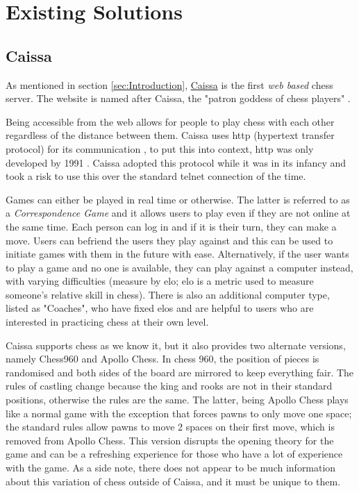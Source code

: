 \section{Existing Solutions}
\label{ExistingSolutions}

\subsection{Caissa}
\label{Caissa}

As mentioned in section \ref{sec:Introduction}, \href{https://caissa.com}{Caissa} is the first \emph{web based} chess server. The website is named after Caissa, the "patron goddess of chess players" \cite{WhoIsCaissa}. 

Being accessible from the web allows for people to play chess with each other regardless of the distance between them. Caissa uses http (hypertext transfer protocol) for its communication \cite{CaissaAboutPage}, to put this into context, http was only developed by 1991 \cite{HTTP}. Caissa adopted this protocol while it was in its infancy and took a risk to use this over the standard telnet connection of the time.

\cite{CaissaHomePage} Games can either be played in real time or otherwise. The latter is referred to as a \emph{Correspondence Game} and it allows users to play even if they are not online at the same time. Each person can log in and if it is their turn, they can make a move. Users can befriend the users they play against and this can be used to initiate games with them in the future with ease. Alternatively, if the user wants to play a game and no one is available, they can play against a computer instead, with varying difficulties (measure by elo; elo is a metric used to measure someone's relative skill in chess). There is also an additional computer type, listed as "Coaches", who have fixed elos and are helpful to users who are interested in practicing chess at their own level.

Caissa supports chess as we know it, but it also provides two alternate versions, namely Chess960 and Apollo Chess. In chess 960, the position of pieces is randomised and both sides of the board are mirrored to keep everything fair. The rules of castling change because the king and rooks are not in their standard positions, otherwise the rules are the same. The latter, being Apollo Chess plays like a normal game with the exception that forces pawns to only move one space; the standard rules allow pawns to move 2 spaces on their first move, which is removed from Apollo Chess. This version disrupts the opening theory for the game and can be a refreshing experience for those who have a lot of experience with the game. As a side note, there does not appear to be much information about this variation of chess outside of Caissa, and it must be unique to them.

